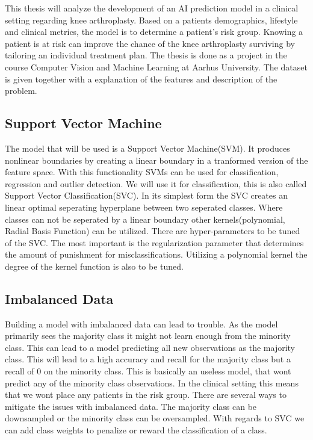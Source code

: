 This thesis will analyze the development of an AI prediction model in a clinical setting regarding knee arthroplasty. Based on a patients demographics, lifestyle and clinical metrics, the model is to determine a patient's risk group. Knowing a patient is at risk can improve the chance of the knee arthroplasty surviving by tailoring an individual treatment plan. The thesis is done as a project in the course Computer Vision and Machine Learning at Aarhus University. The dataset is given together with a explanation of the features and description of the problem.     

\subsection*{Support Vector Machine}
The model that will be used is a Support Vector Machine(SVM). It produces nonlinear boundaries by creating a linear boundary in a tranformed version of the feature space. With this functionality SVMs can be used for classification, regression and outlier detection. We will use it for classification, this is also called Support Vector Classification(SVC). In its simplest form the SVC creates an linear optimal seperating hyperplane between two seperated classes. Where classes can not be seperated by a linear boundary other kernels(polynomial, Radial Basis Function) can be utilized. There are hyper-parameters to be tuned of the SVC. The most important is the regularization parameter that determines the amount of punishment for misclassifications. Utilizing a polynomial kernel the degree of the kernel function is also to be tuned.        

\subsection*{Imbalanced Data}
Building a model with imbalanced data can lead to trouble. As the model primarily sees the majority class it might not learn enough from the minority class. This can lead to a model predicting all new observations as the majority class. This will lead to a high accuracy and recall for the majority class but a recall of 0 on the minority class. This is basically an useless model, that wont predict any of the minority class observations. In the clinical setting this means that we wont place any patients in the risk group. There are several ways to mitigate the issues with imbalanced data. The majority class can be downsampled or the minority class can be oversampled. With regards to SVC we can add class weights to penalize or reward the classification of a class.    


